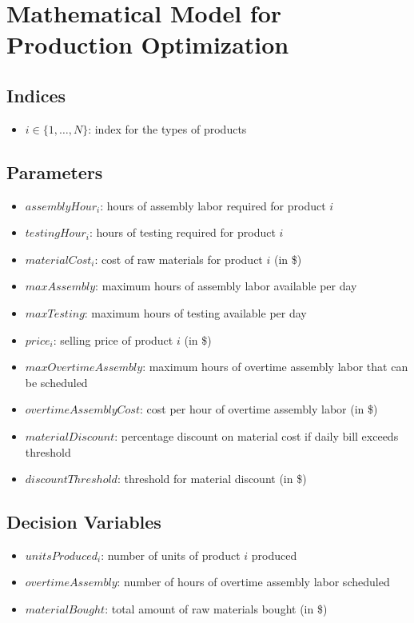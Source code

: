 \documentclass{article}
\begin{document}
\section*{Mathematical Model for Production Optimization}

\subsection*{Indices}
\begin{itemize}
    \item $i \in \{1, \ldots, N\}$: index for the types of products
\end{itemize}

\subsection*{Parameters}
\begin{itemize}
    \item $assemblyHour_i$: hours of assembly labor required for product $i$
    \item $testingHour_i$: hours of testing required for product $i$
    \item $materialCost_i$: cost of raw materials for product $i$ (in \$)
    \item $maxAssembly$: maximum hours of assembly labor available per day
    \item $maxTesting$: maximum hours of testing available per day
    \item $price_i$: selling price of product $i$ (in \$)
    \item $maxOvertimeAssembly$: maximum hours of overtime assembly labor that can be scheduled
    \item $overtimeAssemblyCost$: cost per hour of overtime assembly labor (in \$)
    \item $materialDiscount$: percentage discount on material cost if daily bill exceeds threshold
    \item $discountThreshold$: threshold for material discount (in \$)
\end{itemize}

\subsection*{Decision Variables}
\begin{itemize}
    \item $unitsProduced_i$: number of units of product $i$ produced
    \item $overtimeAssembly$: number of hours of overtime assembly labor scheduled
    \item $materialBought$: total amount of raw materials bought (in \$)
\end{itemize}
\end{document}
